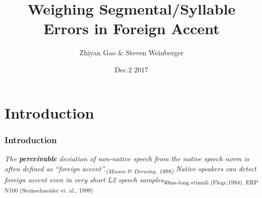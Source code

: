\documentclass{beamer}
\title[Accents 17 Presentation]{ Weighing Segmental/Syllable Errors in Foreign Accent} %
\author{Zhiyan Gao \& Steven Weinberger} %
\institute[GMU] %
{
George Mason University \\ %
\medskip
\textit{Accents 2017} %
}
\date{Dec.2 2017} %
\begin{document}
\begin{frame}
\titlepage %
\end{frame}



\section{Introduction}
\begin{frame}
\frametitle{Introduction}
\begin{enumerate}
\linebreak\linebreak
{}\textit{The {\bf perceivable} deviation of non-native speech from the native speech norm is often defined as “foreign accent”.\linebreak\textsubscript {(Munro \& Derwing, 1998)} }\linebreak
\linebreak
{}\linebreak\linebreak
{}\textit{Native speakers can detect foreign accent even in very short L2 speech samples}\linebreak\textsubscript{30ms-long stimuli (Flege,1984), ERP N100 (Steinschneider et. al., 1999)}
\end{enumerate}
\end{frame}
\end{document}
